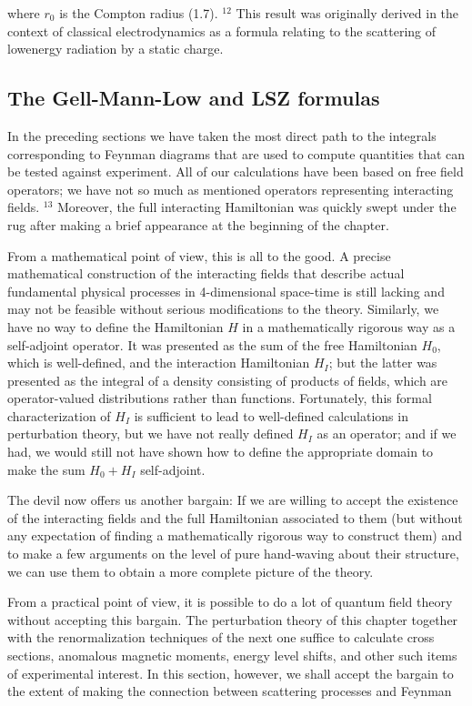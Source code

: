 \documentclass[10pt, letterpaper]{article}
\begin{document}
where $r_{0}$ is the Compton radius (1.7). ${ }^{12}$ This result was originally derived in the context of classical electrodynamics as a formula relating to the scattering of lowenergy radiation by a static charge.

\subsection*{The Gell-Mann-Low and LSZ formulas}
In the preceding sections we have taken the most direct path to the integrals corresponding to Feynman diagrams that are used to compute quantities that can be tested against experiment. All of our calculations have been based on free field operators; we have not so much as mentioned operators representing interacting fields. ${ }^{13}$ Moreover, the full interacting Hamiltonian was quickly swept under the rug after making a brief appearance at the beginning of the chapter.

From a mathematical point of view, this is all to the good. A precise mathematical construction of the interacting fields that describe actual fundamental physical processes in 4-dimensional space-time is still lacking and may not be feasible without serious modifications to the theory. Similarly, we have no way to define the Hamiltonian $H$ in a mathematically rigorous way as a self-adjoint operator. It was presented as the sum of the free Hamiltonian $H_{0}$, which is well-defined, and the interaction Hamiltonian $H_{I}$; but the latter was presented as the integral of a density consisting of products of fields, which are operator-valued distributions rather than functions. Fortunately, this formal characterization of $H_{I}$ is sufficient to lead to well-defined calculations in perturbation theory, but we have not really defined $H_{I}$ as an operator; and if we had, we would still not have shown how to define the appropriate domain to make the sum $H_{0}+H_{I}$ self-adjoint.

The devil now offers us another bargain: If we are willing to accept the existence of the interacting fields and the full Hamiltonian associated to them (but without any expectation of finding a mathematically rigorous way to construct them) and to make a few arguments on the level of pure hand-waving about their structure, we can use them to obtain a more complete picture of the theory.

From a practical point of view, it is possible to do a lot of quantum field theory without accepting this bargain. The perturbation theory of this chapter together with the renormalization techniques of the next one suffice to calculate cross sections, anomalous magnetic moments, energy level shifts, and other such items of experimental interest. In this section, however, we shall accept the bargain to the extent of making the connection between scattering processes and Feynman
\end{document}
